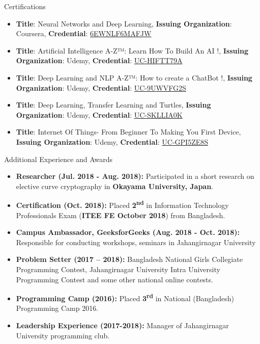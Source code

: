 \documentclass[]{mcdowellcv}
\begin{document}
	\begin{cvsection}{Certifications}
		\begin{cvsubsection}{}{}{}	
		       \vspace{2.1pt}
			\begin{itemize}
			  \item \textbf{Title}: Neural Networks and Deep Learning, \textbf{Issuing Organization}: Coursera, \textbf{Credential}:  \href{https://www.coursera.org/account/accomplishments/certificate/6EWNLF6MAFJW}{6EWNLF6MAFJW}
			  \item \textbf{Title}:  Artificial Intelligence A-Z™: Learn How To Build An AI !, \textbf{Issuing Organization}: Udemy, \textbf{Credential}:  \href{http://ude.my/UC-HIFTT79A}{UC-HIFTT79A}
			  \item \textbf{Title}:  Deep Learning and NLP A-Z™: How to create a ChatBot !, \textbf{Issuing Organization}: Udemy, \textbf{Credential}:  \href{http://ude.my/UC-9UWVFG2S}{UC-9UWVFG2S}
			  \item \textbf{Title}: Deep Learning, Transfer Learning and Turtles, \textbf{Issuing Organization}: Udemy, \textbf{Credential}:  \href{http://ude.my/UC-SKLLIA0K}{UC-SKLLIA0K}
			   \item \textbf{Title}: Internet Of Things- From Beginner To Making You First Device, \textbf{Issuing Organization}: Udemy, \textbf{Credential}:  \href{http://ude.my/UC-GPI5ZE8S}{UC-GPI5ZE8S}
			\end{itemize}
		\end{cvsubsection}
	\end{cvsection}
	\begin{cvsection}{Additional Experience and Awards}
		\begin{cvsubsection}{}{}{}	
		       \vspace{2.1pt}
			\begin{itemize}
			  \item \textbf{Researcher (Jul. 2018 - Aug. 2018):} Participated in a short research on elective curve cryptography in \textbf{Okayama University, Japan}.
			  \item \textbf{Certification (Oct. 2018):}  Placed \textbf{2\textsuperscript{nd}} in Information Technology Professionals Exam (\textbf{ITEE FE October 2018}) from Bangladesh.
			  \item \textbf{Campus Ambassador, GeeksforGeeks (Aug. 2018 - Oct. 2018):} Responsible for conducting workshops, seminars in Jahangirnagar University
			  \item \textbf{Problem Setter (2017 – 2018):} Bangladesh National Girls Collegiate Programming Contest, Jahangirnagar University Intra University Programming Contest and some other national online contests.
			  \item \textbf{Programming Camp (2016):} Placed \textbf{3\textsuperscript{rd}} in National (Bangladesh) Programming Camp 2016.
			  \item \textbf{Leadership Experience (2017-2018):} Manager of Jahangirnagar  University programming club.
			\end{itemize}
		\end{cvsubsection}
	\end{cvsection}
\end{document}
